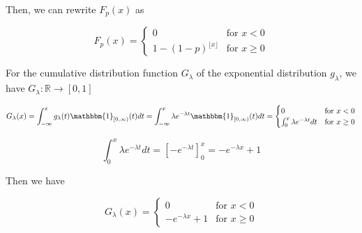 \documentclass[12pt]{article}
\begin{document}
\begin{enumerate}
Then, we can rewrite $F_p(x)$ as


\[
    F_p(x)= 
    \begin{cases}
        0 & \text{for } x<0\\
        1-(1-p)^{\lfloor x \rfloor}  & \text{for } x \geq 0
    \end{cases} 
\]



For the cumulative distribution function $G_\lambda$ of the exponential distribution $g_\lambda$, we have $G_\lambda: \mathbb{R} \rightarrow [0,1]$


\[
    G_\lambda(x)=\int_{-\infty}^{x} g_\lambda(t) \mathbbm{1}_{[0, \infty)}(t) dt= \int_{-\infty}^{x} \lambda e^{-\lambda t} \mathbbm{1}_{[0, \infty)}(t) dt = \begin{cases}
        0 & \text{for } x<0\\
        \int_{0}^{x} \lambda e^{-\lambda t} dt  & \text{for } x \geq 0
    \end{cases}
\]

\[
     \int_{0}^{x} \lambda e^{-\lambda t} dt = \left[-e^{-\lambda t}\right]_{0}^{x} = -e^{-\lambda x}+1    
\]

Then we have

\[
    G_\lambda(x)= \begin{cases}
        0 & \text{for } x<0\\
        -e^{-\lambda x}+1  & \text{for } x \geq 0
    \end{cases}
\]


\end{enumerate}
\end{document}
